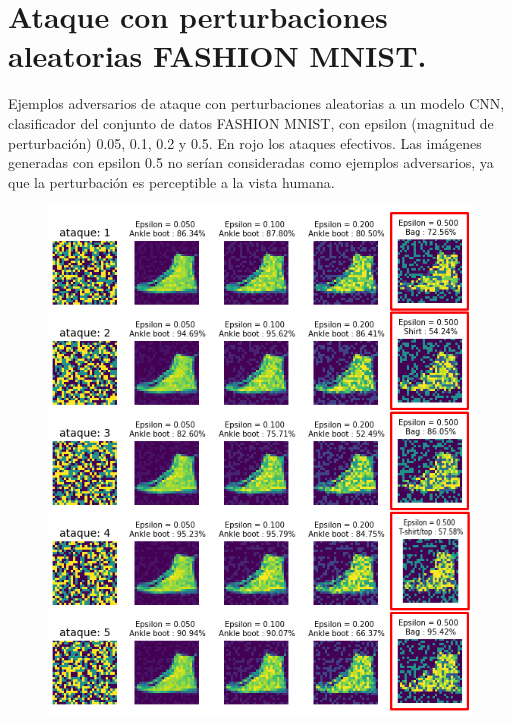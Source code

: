 
\renewcommand{\appendixname}{Anexo}
\chapter{Ataque con perturbaciones aleatorias FASHION MNIST. 
} %

\label{AppendixA} %

Ejemplos adversarios de ataque con perturbaciones aleatorias a un modelo CNN, clasificador del conjunto de datos FASHION MNIST, con epsilon (magnitud de perturbación) 0.05, 0.1, 0.2 y 0.5. En rojo los ataques efectivos. Las imágenes generadas con epsilon 0.5 no serían consideradas como  ejemplos adversarios, ya que la perturbación es perceptible a la vista humana.
\begin{figure}[!h]
    \centering
    \includegraphics[scale = 0.85]{Figures/figura_67_1.PNG}
    \label{fig:67_1}
\end{figure}

